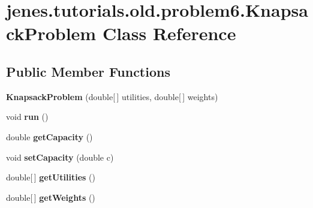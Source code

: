 \hypertarget{classjenes_1_1tutorials_1_1old_1_1problem6_1_1_knapsack_problem}{
\section{jenes.tutorials.old.problem6.KnapsackProblem Class Reference}
\label{classjenes_1_1tutorials_1_1old_1_1problem6_1_1_knapsack_problem}
}
\subsection*{Public Member Functions}
\begin{CompactItemize}
\item 
\hypertarget{classjenes_1_1tutorials_1_1old_1_1problem6_1_1_knapsack_problem_98ced3e27ae818b37a2a3eb0049d6e85}{
\textbf{KnapsackProblem} (double\mbox{[}$\,$\mbox{]} utilities, double\mbox{[}$\,$\mbox{]} weights)}
\label{classjenes_1_1tutorials_1_1old_1_1problem6_1_1_knapsack_problem_98ced3e27ae818b37a2a3eb0049d6e85}

\item 
\hypertarget{classjenes_1_1tutorials_1_1old_1_1problem6_1_1_knapsack_problem_dbb69b885007d3726fc810356eac67c0}{
void \textbf{run} ()}
\label{classjenes_1_1tutorials_1_1old_1_1problem6_1_1_knapsack_problem_dbb69b885007d3726fc810356eac67c0}

\item 
\hypertarget{classjenes_1_1tutorials_1_1old_1_1problem6_1_1_knapsack_problem_bd6659702b32915c9b2a5a6666f1dc48}{
double \textbf{getCapacity} ()}
\label{classjenes_1_1tutorials_1_1old_1_1problem6_1_1_knapsack_problem_bd6659702b32915c9b2a5a6666f1dc48}

\item 
\hypertarget{classjenes_1_1tutorials_1_1old_1_1problem6_1_1_knapsack_problem_ecba52f753029fdda23b07cf2242f924}{
void \textbf{setCapacity} (double c)}
\label{classjenes_1_1tutorials_1_1old_1_1problem6_1_1_knapsack_problem_ecba52f753029fdda23b07cf2242f924}

\item 
\hypertarget{classjenes_1_1tutorials_1_1old_1_1problem6_1_1_knapsack_problem_128edb3ce375d4f9198e4c8373efb183}{
double\mbox{[}$\,$\mbox{]} \textbf{getUtilities} ()}
\label{classjenes_1_1tutorials_1_1old_1_1problem6_1_1_knapsack_problem_128edb3ce375d4f9198e4c8373efb183}

\item 
\hypertarget{classjenes_1_1tutorials_1_1old_1_1problem6_1_1_knapsack_problem_b14674173825d76b3fb45b0a7e4f664e}{
double\mbox{[}$\,$\mbox{]} \textbf{getWeights} ()}
\label{classjenes_1_1tutorials_1_1old_1_1problem6_1_1_knapsack_problem_b14674173825d76b3fb45b0a7e4f664e}

\end{CompactItemize}
